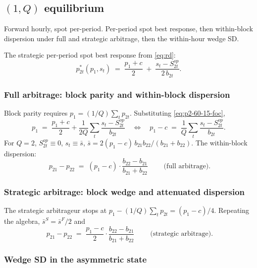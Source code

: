 \documentclass[11pt,a4paper]{article}
\theoremstyle{definition}
\theoremstyle{remark}
\theoremstyle{plain}
\begin{document}
\subsection{$(1,Q)$ equilibrium}\label{sec:state-60-15-app}

Forward hourly, spot per-period. Per-period spot best response, then within-block dispersion under full and strategic arbitrage, then the within-hour wedge SD.

The strategic per-period spot best response from \eqref{eq:rd}:
\begin{equation}
p_{2t}^*(p_1, s_t) \;=\; \frac{p_1 + c}{2} \;+\; \frac{s_t - S^{op}_{2t}}{2\, b_{2t}}.
\label{eq:p2-60-15-foc}
\end{equation}

\subsubsection{Full arbitrage: block parity and within-block dispersion}
Block parity requires $p_1 = (1/Q) \sum_t p_{2t}$. Substituting \eqref{eq:p2-60-15-foc},
\[
p_1 \;=\; \frac{p_1 + c}{2} + \frac{1}{2 Q}\!\sum_t\!\frac{s_t - S^{op}_{2t}}{b_{2t}}
\quad\Longleftrightarrow\quad
p_1 - c \;=\; \frac{1}{Q}\!\sum_t\!\frac{s_t - S^{op}_{2t}}{b_{2t}}.
\]
For $Q = 2$, $S^{op}_{2t} \equiv 0$, $s_t \equiv \bar s$, $\bar s = 2(p_1 - c)\, b_{21} b_{22}/(b_{21} + b_{22})$. The within-block dispersion:
\begin{equation}
\boxed{\;p_{21} - p_{22} \;=\; (p_1 - c)\cdot \frac{b_{22} - b_{21}}{b_{21} + b_{22}}\;}\qquad\text{(full arbitrage)}.
\label{eq:within-block-full}
\end{equation}

\subsubsection{Strategic arbitrage: block wedge and attenuated dispersion}
The strategic arbitrageur stops at $p_1 - (1/Q)\sum_t p_{2t} = (p_1 - c)/4$. Repeating the algebra, $\bar s^{S} = \bar s^{F}/2$ and
\begin{equation}
\boxed{\;p_{21} - p_{22} \;=\; \frac{p_1 - c}{2}\cdot\frac{b_{22} - b_{21}}{b_{21} + b_{22}}\;}\qquad\text{(strategic arbitrage)}.
\label{eq:within-block-strategic}
\end{equation}

\subsubsection{Wedge SD in the asymmetric state}
\end{document}

